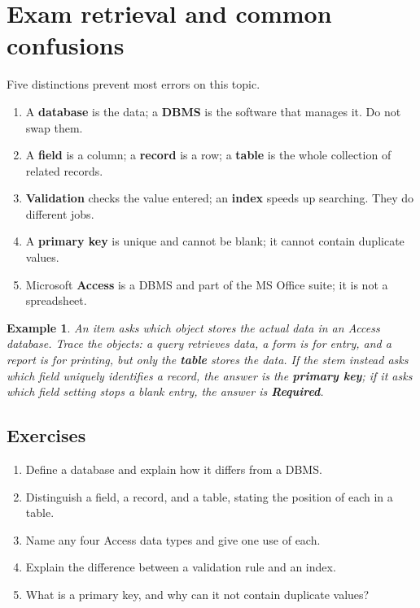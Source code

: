 \documentclass[11pt]{article}
\newtheorem{example}{Example}[section]
\begin{document}
\section{Exam retrieval and common confusions}
Five distinctions prevent most errors on this topic.
\begin{enumerate}
  \item A \textbf{database} is the data; a \textbf{DBMS} is the software that
    manages it. Do not swap them.
  \item A \textbf{field} is a column; a \textbf{record} is a row; a
    \textbf{table} is the whole collection of related records.
  \item \textbf{Validation} checks the value entered; an \textbf{index}
    speeds up searching. They do different jobs.
  \item A \textbf{primary key} is unique and cannot be blank; it cannot
    contain duplicate values.
  \item Microsoft \textbf{Access} is a DBMS and part of the MS Office suite;
    it is not a spreadsheet.
\end{enumerate}

\begin{example}
An item asks which object stores the actual data in an Access database.
Trace the objects: a query retrieves data, a form is for entry, and a report
is for printing, but only the \textbf{table} stores the data. If the stem
instead asks which field uniquely identifies a record, the answer is the
\textbf{primary key}; if it asks which field setting stops a blank entry, the
answer is \textbf{Required}.
\end{example}

\subsection*{Exercises}
\begin{enumerate}[label=\arabic*.]
  \item Define a database and explain how it differs from a DBMS.
  \item Distinguish a field, a record, and a table, stating the position of
    each in a table.
  \item Name any four Access data types and give one use of each.
  \item Explain the difference between a validation rule and an index.
  \item What is a primary key, and why can it not contain duplicate values?
\end{enumerate}
\end{document}
